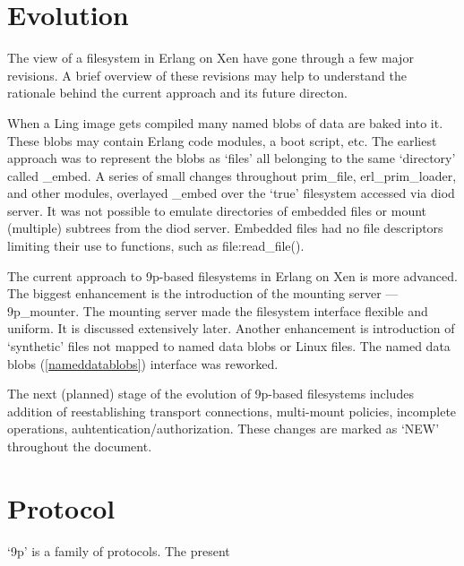 
\def\mytitle{9p-based filesystems    \\
Implementation Notes    \\
v1.3}
\def\myauthor{Maxim Kharchenko}
\def\mydate{December 12, 2012}
\def\mycopyright{2012, Cloudozer LLP. All Rights Reserved.}
\def\latexmode{memoir}

\chapter{Evolution}
\label{evolution}

The view of a filesystem in Erlang on Xen have gone through a few major
revisions. A brief overview of these revisions may help to understand the
rationale behind the current approach and its future directon.

When a Ling image gets compiled many named blobs of data are baked into it.
These blobs may contain Erlang code modules, a boot script, etc. The earliest
approach was to represent the blobs as `files' all belonging to the same
`directory' called \_embed. A series of small changes throughout prim\_file,
erl\_prim\_loader, and other modules, overlayed \_embed over the `true' filesystem
accessed via diod server. It was not possible to emulate directories of embedded
files or mount (multiple) subtrees from the diod server. Embedded files had no
file descriptors limiting their use to functions, such as file:read\_file().

The current approach to 9p-based filesystems in Erlang on Xen is more advanced.
The biggest enhancement is the introduction of the mounting server --- 9p\_mounter.
The mounting server made the filesystem interface flexible and uniform. It is
discussed extensively later. Another enhancement is introduction of `synthetic'
files not mapped to named data blobs or Linux files. The named data blobs (\autoref{nameddatablobs})
interface was reworked.

The next (planned) stage of the evolution of 9p-based filesystems includes
addition of reestablishing transport connections, multi-mount policies,
incomplete operations, auhtentication\slash authorization. These changes are marked as
`NEW' throughout the document.

\chapter{Protocol}
\label{protocol}

`9p' is a family of protocols. The present 

